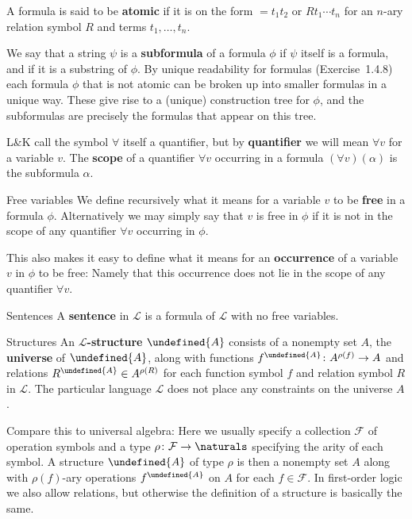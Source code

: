 \documentclass[article, a4paper, 11pt, oneside]{memoir}
\let\mathfrak\undefined
\numberwithin{equation}{chapter}
\newcommand{\calF}{\mathcal{F}}
\newcommand{\calL}{\mathcal{L}}
\newcommand{\frakA}{\mathfrak{A}}
\newcommand{\keyword}[1]{{\bfseries #1}}
\theoremstyle{nonumberplain}
\begin{document}
\begin{notelist}
    A formula is said to be \keyword{atomic} if it is on the form $= t_1 t_2$ or $R t_1 \cdots t_n$ for an $n$-ary relation symbol $R$ and terms $t_1, \ldots, t_n$.
    
    We say that a string $\psi$ is a \keyword{subformula} of a formula $\phi$ if $\psi$ itself is a formula, and if it is a substring of $\phi$. By unique readability for formulas (Exercise~1.4.8) each formula $\phi$ that is not atomic can be broken up into smaller formulas in a unique way. These give rise to a (unique) construction tree for $\phi$, and the subformulas are precisely the formulas that appear on this tree.

    L\&K call the symbol $\forall$ itself a quantifier, but by \keyword{quantifier} we will mean $\forall v$ for a variable $v$. The \keyword{scope} of a quantifier $\forall v$ occurring in a formula $(\forall v)(\alpha)$ is the subformula $\alpha$.

    \item[Free variables]
    We define recursively what it means for a variable $v$ to be \keyword{free} in a formula $\phi$. Alternatively we may simply say that $v$ is free in $\phi$ if it is not in the scope of any quantifier $\forall v$ occurring in $\phi$.
    
    This also makes it easy to define what it means for an \keyword{occurrence} of a variable $v$ in $\phi$ to be free: Namely that this occurrence does not lie in the scope of any quantifier $\forall v$.

    \item[Sentences]
    A \keyword{sentence} in $\calL$ is a formula of $\calL$ with no free variables.
    
    \item[Structures]
    An \keyword{$\calL$-structure} $\frakA$ consists of a nonempty set $A$, the \keyword{universe} of $\frakA$, along with functions $f^\frakA \colon A^{\rho(f)} \to A$ and relations $R^\frakA \in A^{\rho(R)}$ for each function symbol $f$ and relation symbol $R$ in $\calL$. The particular language $\calL$ does not place any constraints on the universe $A$.
    
    Compare this to universal algebra: Here we usually specify a collection $\calF$ of operation symbols and a type $\rho \colon \calF \to \naturals$ specifying the arity of each symbol. A structure $\frakA$ of type $\rho$ is then a nonempty set $A$ along with $\rho(f)$-ary operations $f^\frakA$ on $A$ for each $f \in \calF$. In first-order logic we also allow relations, but otherwise the definition of a structure is basically the same.


\end{notelist}
\end{document}
